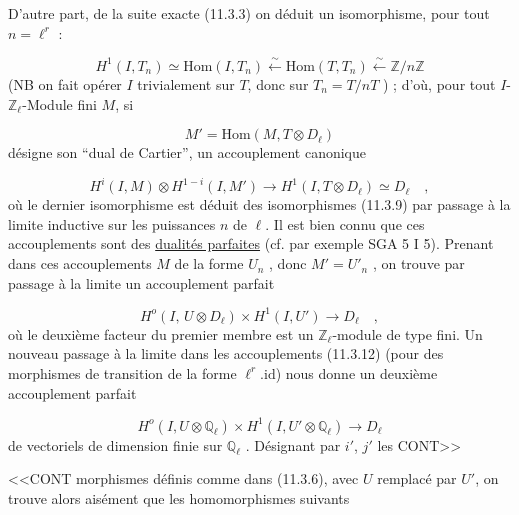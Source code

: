 D'autre part, de la suite exacte (11.3.3) on déduit un isomorphisme, pour tout $n = \ell^r$ :

\begin{equation}\tag{11.3.9}
H^1(I,T_n) \simeq \mathrm{Hom}(I,T_n) \xleftarrow{\sim} \mathrm{Hom}(T,T_n) \xleftarrow{\sim} \mathbb{Z}/n\mathbb{Z}
\end{equation}
(NB on fait opérer $I$ trivialement sur $T$, donc sur $T_n = T/nT$ ) ; d'où, pour tout $I$-$\mathbb{Z}_\ell$-Module fini $M$, si

\begin{equation}\tag{11.3.10}
M' = \mathrm{Hom}(M, T \otimes D_\ell)
\end{equation}
désigne son ``dual de Cartier'', un accouplement canonique

\begin{equation}\tag{11.3.11}
H^i(I,M) \otimes H^{1-i}(I,M') \longrightarrow H^1(I,T \otimes D_\ell) \simeq D_\ell \quad ,
\end{equation}
où le dernier isomorphisme est déduit des isomorphismes (11.3.9) par passage à la limite inductive sur les puissances $n$ de $\ell$. Il est bien connu que ces accouplements sont des \underline{dualités parfaites} (cf. par exemple SGA 5 I 5). Prenant dans ces accouplements $M$ de la forme $U_n$ , donc $M' = U'_n$ , on trouve par passage à la limite un accouplement parfait

\begin{equation}\tag{11.3.12}
H^o(I,\, U \otimes D_\ell) \times H^1(I,U') \longrightarrow D_\ell \quad ,
\end{equation}
où le deuxième facteur du premier membre est un $\mathbb{Z}_\ell$-module de type fini. Un nouveau passage à la limite dans les accouplements (11.3.12) (pour des morphismes de transition de la forme $\ell^r.\mathrm{id}$) nous donne un deuxième accouplement parfait

\begin{equation}\tag{11.3.13}
H^o(I,U \otimes \mathbb{Q}_\ell) \times H^1(I,U' \otimes \mathbb{Q}_\ell) \longrightarrow D_\ell
\end{equation}
de vectoriels de dimension finie sur $\mathbb{Q}_\ell$ . Désignant par $i'$, $j'$ les CONT>>



<<CONT morphismes définis comme dans (11.3.6), avec $U$ remplacé par $U'$, on trouve alors aisément que les homomorphismes suivants

